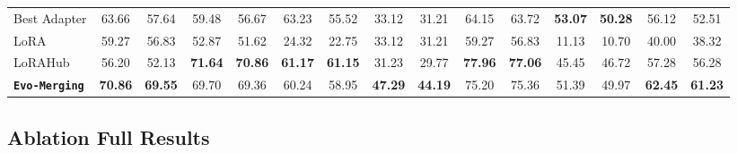 \begin{table}[t!]
\begin{tabular}{l cc cc cc cc cc cc c c}
    Best Adapter    & 63.66 & 57.64 & 59.48 & 56.67 & 63.23 & 55.52 & 33.12 & 31.21 & 64.15 & 63.72 & \textbf{53.07} & \textbf{50.28} & 56.12 & 52.51 \\
    LoRA            & 59.27 & 56.83 & 52.87 & 51.62 & 24.32 & 22.75 & 33.12 & 31.21 & 59.27 & 56.83 & 11.13 & 10.70 & 40.00 & 38.32 \\
    LoRAHub         & 56.20 & 52.13 & \textbf{71.64} & \textbf{70.86} & \textbf{61.17} & \textbf{61.15} & 31.23 & 29.77 & \textbf{77.96} & \textbf{77.06} & 45.45 & 46.72 & 57.28 & 56.28 \\
    \midrule
    \textbf{\texttt{Evo-Merging}} & \textbf{70.86} & \textbf{69.55} & 69.70 & 69.36 & 60.24 & 58.95 & \textbf{47.29} & \textbf{44.19} & 75.20 & 75.36 & 51.39 & 49.97 & \textbf{62.45} & \textbf{61.23} \\
    \bottomrule
  \end{tabular}
  \vspace{-2mm}
\end{table}





\subsection{Ablation Full Results}
\label{tab:detailed_ablation_final_v2_full}

